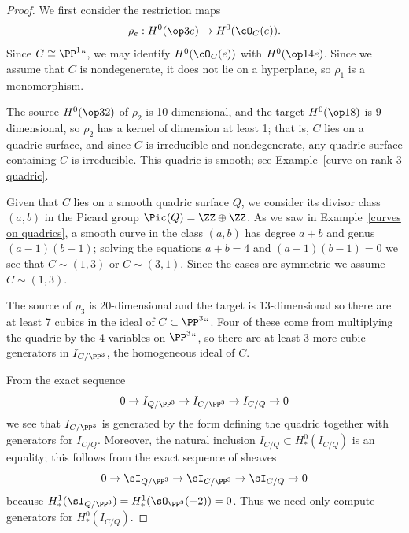 \begin{proof}
We first consider the restriction maps
$$
\rho_e: H^0(\op3e)\to H^0(\cO_C(e)).
$$
Since $C\cong \PP^1` `$,
we may identify $H^0(\cO_C(e))$ with 
$H^0(\op1{4e})$.
 Since we assume that $C$ is nondegenerate, it does not lie on a hyperplane,
 so  $\rho_1$ is a monomorphism. 
 
The source $H^0(\op32)$ of $\rho_2$ is 10-dimensional, and the target $H^0(\op18)$ is
9-dimensional, so $\rho_2$ has a kernel of dimension at least 1; that is, $C$ lies on
a quadric surface, and since $C$ is irreducible and nondegenerate, any quadric surface containing
$C$ is irreducible. This quadric is smooth; 
see Example~\ref{curve on rank 3 quadric}.


Given that $C$ lies on a smooth quadric surface $Q$, we consider its divisor class $(a,b)$ in the 
Picard group $\Pic(Q) = \ZZ\oplus \ZZ$. As we saw in Example~\ref{curves on quadrics}, a smooth curve
in the class $(a,b)$ has degree $a+b$ and genus $(a{-}1)(b{-}1)$;
solving the equations $a+b=4$ 
and
$(a{-}1)(b{-}1)=0$ we see that $C\sim (1,3)$ or $C\sim (3,1)$. Since the cases
are symmetric we assume $C\sim(1,3)$. 

The source of $\rho_3$ is 20-dimensional and the target is 
13-dimensional so there are at least 7
cubics in the ideal of $C\subset \PP^3` `$. Four of these come from multiplying the quadric
by the 4 variables on $\PP^3` `$, so there are at least 3 more cubic generators in $I_{C/\PP^3}$,
 the homogeneous ideal of $C$. 

From the exact sequence 
$$
0\to I_{Q/\PP^3} \to I_{C/\PP^3} \to I_{C/Q} \to 0
$$
we see that $I_{C/\PP^3}$ is generated by the form defining the quadric 
together with generators for $I_{C/Q}$. Moreover, 
the natural inclusion $I_{C/Q}\subset H^{0}_{*}(I_{C/Q})$ is an equality; this follows from the exact sequence of sheaves
$$
0\to \sI_{Q/\PP^3} \to \sI_{C/\PP^3} \to \sI_{C/Q} \to 0
$$
because $H^{1}_{*}(\sI_{Q/\PP^3}) = H^{1}_{*}(\sO_{\PP^3}(-2)) = 0$.
Thus we need only compute generators for $H^{0}_{*}(I_{C/Q})$.


\end{proof}
